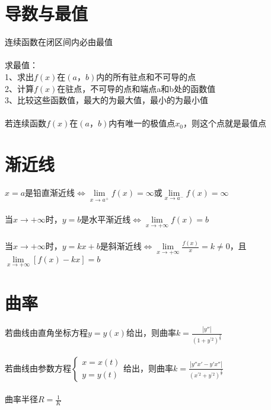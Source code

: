 \documentclass{article}
\begin{document}
\begin{flushleft}
	\section{导数与最值}
	
	连续函数在闭区间内必由最值\\
	~\\
	求最值：\\
	1、求出$f(x)$在$(a，b)$内的所有驻点和不可导的点\\
	2、计算$f(x)$在驻点，不可导的点和端点a和b处的函数值\\
	3、比较这些函数值，最大的为最大值，最小的为最小值\\
	~\\
	若连续函数$f(x)$在$(a，b)$内有唯一的极值点$x_0$，则这个点就是最值点\\
	
	\section{渐近线}
	
	$x=a$是铅直渐近线$\Leftrightarrow \lim\limits_{x\to a^+}f(x)=\infty$或$\lim\limits_{x\to a^-}f(x)=\infty$\\
	~\\
	当$x\to +\infty$时，$y=b$是水平渐近线$\Leftrightarrow \lim\limits_{x\to +\infty}f(x)=b$\\
	~\\
	当$x\to +\infty$时，$y=kx+b$是斜渐近线$\Leftrightarrow \lim\limits_{x\to +\infty}\frac{f(x)}{x}=k\neq 0$，且$\lim\limits_{x\to +\infty}[f(x)-kx]=b$\\
	
	\section{曲率}
	
	若曲线由直角坐标方程$y=y(x)$给出，则曲率$k=\frac{|y''|}{(1+y^{'2})^{\frac{3}{2}}}$\\
	~\\
	若曲线由参数方程$\left\{
	\begin{array}{rcl}
	x=x(t)\\
	y=y(t)
	\end{array} \right.$给出，则曲率$k=\frac{|y''x'-y'x''|}{(x^{'2}+y^{'2})^{\frac{3}{2}}}$\\
	~\\
	曲率半径$R=\frac{1}{K}$\\
	
\end{flushleft}
\end{document}
